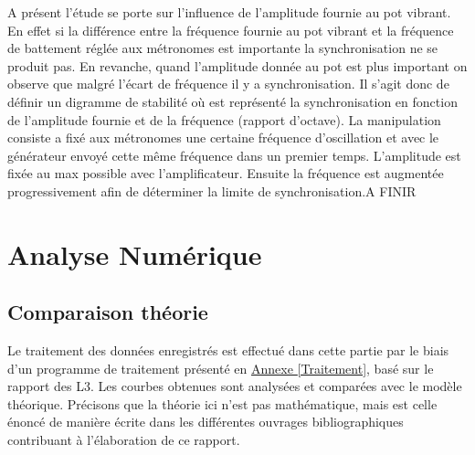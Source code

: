 \documentclass[a4paper,11pt]{report}
\begin{document}
	A présent l'étude se porte sur l'influence de l'amplitude fournie au pot vibrant. En effet si la différence entre la fréquence fournie au pot vibrant et la fréquence de battement réglée aux métronomes est importante la synchronisation ne se produit pas. En revanche, quand l'amplitude donnée au pot est plus important on observe que malgré l'écart de fréquence il y a synchronisation. Il s'agit donc de définir un digramme de stabilité où est représenté la synchronisation en fonction de l'amplitude fournie et de la fréquence (rapport d'octave). La manipulation consiste a fixé aux métronomes une certaine fréquence d'oscillation et avec le générateur envoyé cette même fréquence dans un premier temps. L'amplitude est fixée au max possible avec l'amplificateur. Ensuite la fréquence est augmentée progressivement afin de déterminer la limite de synchronisation.A FINIR 

\chapter{Analyse Numérique}
\section{Comparaison théorie}
Le traitement des données enregistrés est effectué dans cette partie par le biais d'un programme de traitement présenté en \underline{Annexe \ref{Traitement}}, basé sur le rapport des L3\cite{ram}. Les courbes obtenues sont analysées et comparées avec le modèle théorique. Précisons que la théorie ici n'est pas mathématique, mais est celle énoncé de manière écrite dans les différentes ouvrages bibliographiques contribuant à l'élaboration de ce rapport.
\end{document}
